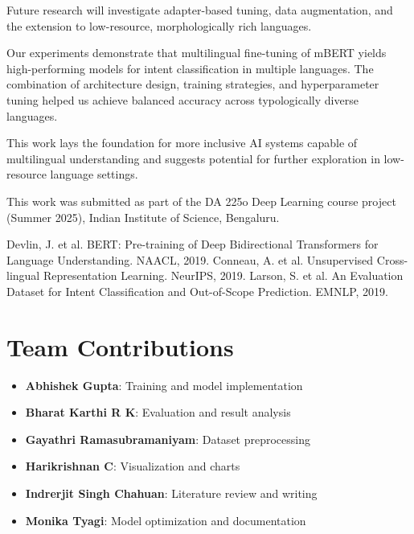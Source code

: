 \documentclass{ecai}
\begin{document}
Future research will investigate adapter-based tuning, data augmentation, and the extension to low-resource, morphologically rich languages.

Our experiments demonstrate that multilingual fine-tuning of mBERT yields high-performing models for intent classification in multiple languages. The combination of architecture design, training strategies, and hyperparameter tuning helped us achieve balanced accuracy across typologically diverse languages.

This work lays the foundation for more inclusive AI systems capable of multilingual understanding and suggests potential for further exploration in low-resource language settings.

\ack This work was submitted as part of the DA 225o Deep Learning course project (Summer 2025), Indian Institute of Science, Bengaluru.


\begin{thebibliography}{}
 Devlin, J. et al. BERT: Pre-training of Deep Bidirectional Transformers for Language Understanding. NAACL, 2019.
 Conneau, A. et al. Unsupervised Cross-lingual Representation Learning. NeurIPS, 2019.
 Larson, S. et al. An Evaluation Dataset for Intent Classification and Out-of-Scope Prediction. EMNLP, 2019.
\end{thebibliography}

\newpage
\section*{Team Contributions}
\begin{itemize}
\item \textbf{Abhishek Gupta}: Training and model implementation
\item \textbf{Bharat Karthi R K}: Evaluation and result analysis
\item \textbf{Gayathri Ramasubramaniyam}: Dataset preprocessing
\item \textbf{Harikrishnan C}: Visualization and charts
\item \textbf{Indrerjit Singh Chahuan}: Literature review and writing
\item \textbf{Monika Tyagi}: Model optimization and documentation
\end{itemize}
\end{document}
